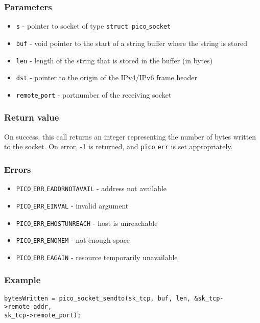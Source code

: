 \subsubsection*{Parameters}
\begin{itemize}[noitemsep]
\item \texttt{s} - pointer to socket of type \texttt{struct pico$\_$socket}
\item \texttt{buf} - void pointer to the start of a string buffer where the string is stored
\item \texttt{len} - length of the string that is stored in the buffer (in bytes)
\item \texttt{dst} - pointer to the origin of the IPv4/IPv6 frame header
\item \texttt{remote$\_$port} - portnumber of the receiving socket
\end{itemize}

\subsubsection*{Return value}
On success, this call returns an integer representing the number of bytes written to the socket.
On error, -1 is returned, and \texttt{pico$\_$err} is set appropriately.

\subsubsection*{Errors}
\begin{itemize}[noitemsep]
\item \texttt{PICO$\_$ERR$\_$EADDRNOTAVAIL} - address not available
\item \texttt{PICO$\_$ERR$\_$EINVAL} - invalid argument
\item \texttt{PICO$\_$ERR$\_$EHOSTUNREACH} - host is unreachable
\item \texttt{PICO$\_$ERR$\_$ENOMEM} - not enough space
\item \texttt{PICO$\_$ERR$\_$EAGAIN} - resource temporarily unavailable
\end{itemize}

\subsubsection*{Example}
\begin{verbatim}
bytesWritten = pico_socket_sendto(sk_tcp, buf, len, &sk_tcp->remote_addr,
sk_tcp->remote_port);
\end{verbatim}


